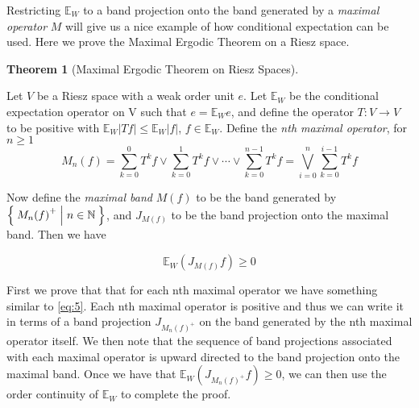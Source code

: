 \documentclass[letterpaper,10pt,oneside,onecolumn,reqno]{amsart}
\newcommand{\E}{\mathbb E}
\newcommand{\NN}{\mathbb N}
\theoremstyle{definition}
\newtheorem{thm}{Theorem}
\newcommand{\join}{\vee}
\begin{document}
Restricting $\E_W$ to a band projection onto the band generated by a
\emph{maximal operator} $M$ will give us a
nice example of how conditional expectation can be used. Here we prove
the Maximal Ergodic Theorem on a Riesz space.

\begin{thm}[Maximal Ergodic Theorem on Riesz Spaces]\label{thr:3}

  Let $V$ be a Riesz space with a weak order unit $e$. Let $\E_W$ be
  the conditional expectation operator on V such that $e = \E_W e$,
  and define the operator $T : V \to V$ to be positive with $\E_W|Tf|
  \leq \E_W|f|$, $f \in \E_W$. Define the \emph{nth maximal operator}, for $n \geq 1$
  \begin{equation}\label{eq:4}
    M_n(f) = \sum\limits_{k=0}^{0} T^k f \join \sum\limits_{k=0}^{1} T^k f \join \cdots \join \sum\limits_{k=0}^{n-1} T^k f = \bigvee_{i=0}^n \sum\limits_{k=0}^{i-1} T^k f
  \end{equation}

  Now define the \emph{maximal band} $M(f)$ to be
  the band generated by $\Set{M_n{(f)}^+ | n \in \NN}$, and $J_{M(f)}$
  to be the band projection onto the maximal band. Then we have

\begin{equation}\label{eq:5}
  \E_W(J_{M(f)}f) \geq 0
\end{equation}
\end{thm}

\begin{framed}
  First we prove that that for each nth maximal operator we have
  something similar to \eqref{eq:5}. Each nth maximal operator is
  positive and thus we can write it in terms of a band projection
  $J_{M_n{(f)}^+}$ on the band generated by the nth maximal operator
  itself. We then note that the sequence of band projections
  associated with each maximal operator is upward directed to the band
  projection onto the maximal band. Once we have that
  $\E_W(J_{M_n{(f)}^+}f) \geq 0$, we can then use the order continuity
  of $\E_W$ to complete the proof.
\end{framed}
\end{document}
